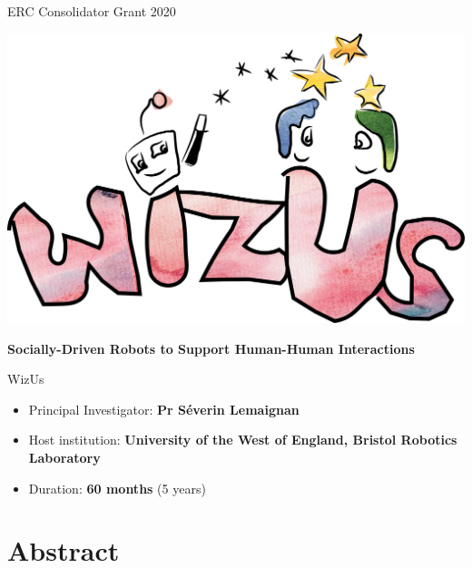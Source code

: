 \documentclass[11pt,a4paper]{report}
\title{\project}
\newcommand{\project}{WizUs\xspace}
\newcommand{\eu}[1]{}
\begin{document}
\maketitle

\begin{center}
    ERC Consolidator Grant 2020

    \vspace{2cm}
    \includegraphics[width=0.7\linewidth]{logo}

    \textbf{\LARGE Socially-Driven Robots to Support Human-Human Interactions}

    \vspace{2cm}
    {\Huge \project}

\end{center}

    \vspace{1cm}

\begin{itemize}
    \item Principal Investigator: \textbf{Pr Séverin Lemaignan}
    \item Host institution: \textbf{University of the West of England, Bristol Robotics
        Laboratory}
    \item Duration: \textbf{60 months} (5 years)
\end{itemize}

\section*{Abstract}\label{abstract}

\eu{The abstract (summary) should, at a glance, provide the reader with a clear
understanding of the objectives of the research proposal and how they will be
achieved. The abstract will be used as the short description of your research
proposal in the evaluation process and in communications to contact in
particular the potential remote referees and/or inform the Commission and/or the
programme management committees and/or relevant national funding agencies
(provided you give permission to do so where requested in the online proposal
submission forms, section 1). It must therefore be short and precise and should
not contain confidential information. \\
Please use plain typed text, avoiding formulae and other special characters. The
abstract must be written in English. There is a limit of 2000 characters (spaces
and line breaks included).}
\end{document}
